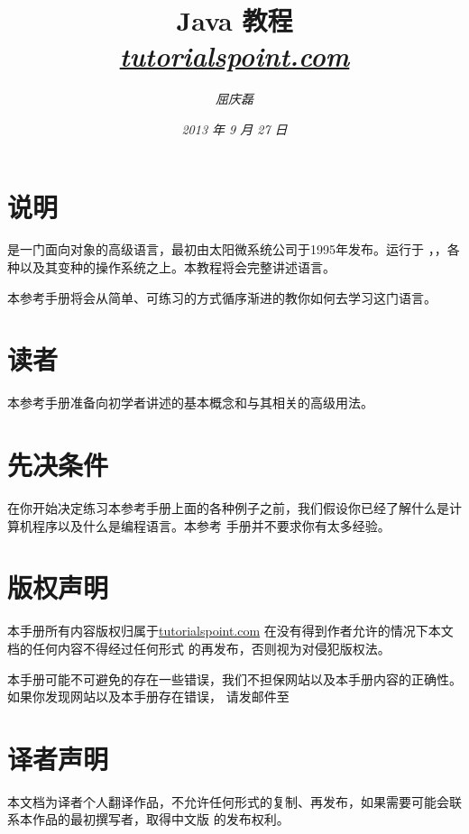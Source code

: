 \documentclass{article}
\begin{document}
\title{%
  {\huge \textsf{Java 教程}\\\smallskip}%
  {\small \textit{\url{tutorialspoint.com}}}
}

\author{\textit{屈庆磊}\\[2mm]
       }

\date{\textit{2013 年 9 月 27 日}}

\maketitle
\begin{multicols}{2}
\tableofcontents
\end{multicols}

\section{说明}
 是一门面向对象的高级语言，最初由太阳微系统公司于1995年发布。运行于
，，各种以及其变种的操作系统之上。本教程将会完整讲述语言。

本参考手册将会从简单、可练习的方式循序渐进的教你如何去学习这门语言。

\section{读者}
本参考手册准备向初学者讲述的基本概念和与其相关的高级用法。

\section{先决条件}
在你开始决定练习本参考手册上面的各种例子之前，我们假设你已经了解什么是计算机程序以及什么是编程语言。本参考
手册并不要求你有太多经验。

\section{版权声明}
本手册所有内容版权归属于\url{tutorialspoint.com} 在没有得到作者允许的情况下本文档的任何内容不得经过任何形式
的再发布，否则视为对侵犯版权法。

本手册可能不可避免的存在一些错误，我们不担保网站以及本手册内容的正确性。如果你发现网站以及本手册存在错误，
请发邮件至

\section{译者声明}
本文档为译者个人翻译作品，不允许任何形式的复制、再发布，如果需要可能会联系本作品的最初撰写者，取得中文版
的发布权利。
\end{document}

